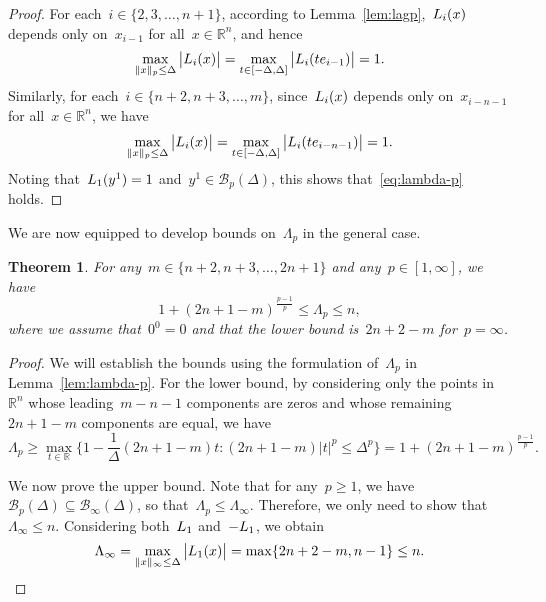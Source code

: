 \documentclass[draft]{article}
\numberwithin{equation}{section}
\theoremstyle{definition}
\theoremstyle{plain}
\newtheorem{theorem}{Theorem}[section]
\newcommand*{\abs}[2][]{#1\lvert#2#1\rvert}
\newcommand*{\lagp}[1][]{L\ifblank{#1}{}{_{#1}}}
\newcommand*{\norm}[2][]{#1\lVert#2#1\rVert}
\newcommand*{\R}{\mathbb{R}}
\newcommand*{\set}[2][]{#1\{#2#1\}}
\begin{document}
\begin{proof}
    For each~$i \in \set{2, 3, \dots, n + 1}$, according to Lemma~\ref{lem:lagp},~$\lagp[i](x)$ depends only on~$x_{i - 1}$ for all~$x \in \R^n$, and hence
    \begin{equation*}
        \max_{\norm{x}_p \le \Delta} \abs[\big]{\lagp[i](x)} = \max_{t \in [-\Delta, \Delta]} \abs[\big]{\lagp[i](t e_{i - 1})} = 1.
    \end{equation*}
    Similarly, for each~$i \in \set{n + 2, n + 3, \dots, m}$, since~$\lagp[i](x)$ depends only on~$x_{i - n - 1}$ for all~$x \in \R^n$, we have
    \begin{equation*}
        \max_{\norm{x}_p \le \Delta} \abs[\big]{\lagp[i](x)} = \max_{t \in [-\Delta, \Delta]} \abs[\big]{\lagp[i](t e_{i - n - 1})} = 1.
    \end{equation*}
    Noting that~$\lagp[1](y^1) = 1$ and~$y^1 \in \mathcal{B}_p(\Delta)$, this shows that~\eqref{eq:lambda-p} holds.
\end{proof}

We are now equipped to develop bounds on~$\Lambda_p$ in the general case.

\begin{theorem}
    \label{thm:lambda-p}
    For any~$m \in \set{n + 2, n + 3, \dots, 2n + 1}$ and any~$p \in [1, \infty]$, we have
    \begin{equation*}
        1 + (2n + 1 - m)^{\frac{p - 1}{p}} \le \Lambda_p \le n,
    \end{equation*}
    where we assume that~$0^0 = 0$ and that the lower bound is~$2n + 2 - m$ for~$p = \infty$.
\end{theorem}

\begin{proof}
    We will establish the bounds using the formulation of~$\Lambda_p$ in Lemma~\ref{lem:lambda-p}.
    For the lower bound, by considering only the points in~$\R^n$ whose leading~$m - n - 1$ components are zeros and whose remaining~$2n + 1 - m$ components are equal, we have
    \begin{equation*}
        \Lambda_p \ge \max_{t \in \R} \set[\bigg]{1 - \frac{1}{\Delta} (2n + 1 - m) t : (2n + 1 - m) \abs{t}^p \le \Delta^p} = 1 + (2n + 1 - m)^{\frac{p - 1}{p}}.
    \end{equation*}

    We now prove the upper bound.
    Note that for any~$p \ge 1$, we have~$\mathcal{B}_p(\Delta) \subseteq \mathcal{B}_{\infty}(\Delta)$, so that~$\Lambda_p \le \Lambda_{\infty}$.
    Therefore, we only need to show that~$\Lambda_{\infty} \le n$.
    Considering both~$\lagp[1]$ and~$-\lagp[1]$, we obtain
    \begin{equation*}
        \Lambda_{\infty} = \max_{\norm{x}_{\infty} \le \Delta} \abs[\big]{\lagp[1](x)} = \max \set{2n + 2 - m, n - 1} \le n.
    \end{equation*}
\end{proof}
\end{document}
